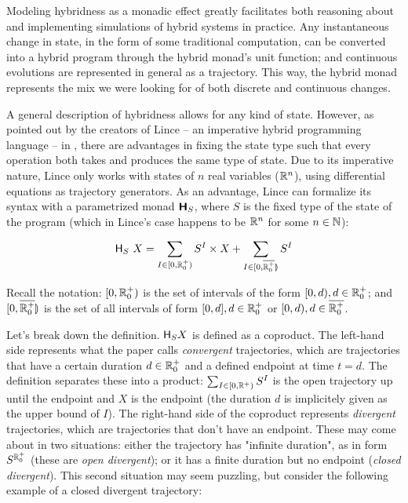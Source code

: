Modeling hybridness as a monadic effect greatly facilitates both reasoning about and implementing simulations of hybrid systems in practice. Any instantaneous change in state, in the form of some traditional computation, can be converted into a hybrid program through the hybrid monad's unit function; and continuous evolutions are represented in general as a trajectory. This way, the hybrid monad represents the mix we were looking for of both discrete and continuous changes.

A general description of hybridness allows for any kind of state. However, as pointed out by the creators of Lince -- an imperative hybrid programming language -- in \cite{goncharov2020}, there are advantages in fixing the state type such that every operation both takes and produces the same type of state. Due to its imperative nature, Lince only works with states of $n$ real variables ($\mathbb{R}^n$), using differential equations as trajectory generators. As an advantage, Lince can formalize its syntax with a parametrized monad $\textbf{\textsf{H}}_S$, where $S$ is the fixed type of the state of the program (which in Lince's case happens to be $\mathbb{R}^n$ for some $n \in \mathbb{N}$):

\begin{equation*}
\textsf{H}_S\ X = \sum_{I \in [0,\mathbb{R}_0^+)}{S^I} \times X + \sum_{I \in [0,\overline{\mathbb{R}_0^+}\rrparenthesis}{S^I}
\end{equation*}

Recall the notation: $[0,\mathbb{R}_0^+)$ is the set of intervals of the form $[0,d), d \in \mathbb{R}_0^+$; and $[0,\overline{\mathbb{R}_0^+}\rrparenthesis$ is the set of all intervals of form $[0,d], d \in \mathbb{R}_0^+$ or $[0,d), d \in \overline{\mathbb{R}_0^+}$.

Let's break down the definition. $\textsf{H}_S X$ is defined as a coproduct. The left-hand side represents what the paper calls \textit{convergent} trajectories, which are trajectories that have a certain duration $d \in \mathbb{R}_0^+$ and a defined endpoint at time $t=d$. The definition separates these into a product: $\sum_{I \in [0,\mathbb{R}^{+})}{S^I}$ is the open trajectory up until the endpoint and $X$ is the endpoint (the duration $d$ is implicitely given as the upper bound of $I$). The right-hand side of the coproduct represents \textit{divergent} trajectories, which are trajectories that don't have an endpoint. These may come about in two situations: either the trajectory has "infinite duration", as in form $S^{\mathbb{R}_0^+}$ (these are \textit{open divergent}); or it has a finite duration but no endpoint (\textit{closed divergent}). This second situation may seem puzzling, but consider the following example of a closed divergent trajectory:

